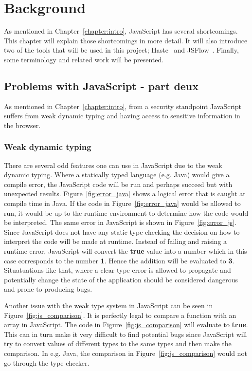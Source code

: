 \chapter{Background}
As mentioned in Chapter~\ref{chapter:intro}, JavaScript has several shortcomings. This chapter will explain those shortcomings in more detail. It will also introduce two of the tools that will be used in this project; Haste~\cite{haste-lang} and JSFlow~\cite{jsflow,jsflow-csf12,jsflow-sac14}. Finally, some terminology and related work will be presented.

\section{Problems with JavaScript - part deux}
As mentioned in Chapter~\ref{chapter:intro}, from a security standpoint JavaScript suffers from weak dynamic typing and having access to sensitive information in the browser.
\subsection{Weak dynamic typing}
\label{chapter:weak-dynamic-typing}
There are several odd features one can use in JavaScript due to the weak dynamic typing. Where a statically typed language (e.g. Java) would give a compile error, the JavaScript code will be run and perhaps succeed but with unexpected results. Figure~\ref{fig:error_java} shows a logical error that is caught at compile time in Java. If the code in Figure~\ref{fig:error_java} would be allowed to run, it would be up to the runtime environment to determine how the code would be interpreted. The same error in JavaScript is shown in Figure~\ref{fig:error_js}. Since JavaScript does not have any static type checking the decision on how to interpret the code will be made at runtime. Instead of failing and raising a runtime error, JavaScript will convert the \textbf{true} value into a number which in this case corresponds to the number \textbf{1}. Hence the addition will be evaluated to \textbf{3}. Situatuations like that, where a clear type error is allowed to propagate and potentially change the state of the application should be considered dangerous and prone to producing bugs.

Another issue with the weak type system in JavaScript can be seen in Figure~\ref{fig:js_comparison}. It is perfectly legal to compare a function with an array in JavaScript. The code in Figure~\ref{fig:js_comparison} will evaluate to \textbf{true}. This can in turn make it very difficult to find potential bugs since JavaScript will try to convert values of different types to the same types and then make the comparison. In e.g. Java, the comparison in Figure~\ref{fig:js_comparison} would not go through the type checker.

